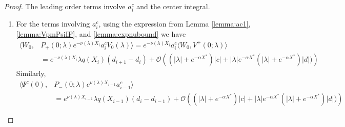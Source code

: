 \documentclass[thesis.tex]{subfiles}
\begin{document}
\begin{lemma}
\begin{proof}
The leading order terms involve $a_i^c$ and the center integral. 
\begin{enumerate}

\item For the terms involving $a_i^c$, using the expression from Lemma \ref{lemma:ac1}, \cref{lemma:VpmPsiIP}, and \cref{lemma:expnubound} we have
\begin{align*}
\langle W_0, &P_+(0; \lambda) e^{-\nu(\lambda)X_i} a_i^c V_0(\lambda) \rangle = e^{-\nu(\lambda)X_i} a_i^c \langle W_0, V^+(0; \lambda) \rangle \\
&= e^{-\nu(\lambda)X_i} \lambda q(X_i) (d_{i+1} - d_i ) + \mathcal{O}\left( (|\lambda| + e^{-\alpha X^*})|c| + |\lambda| e^{-\alpha X^*}(|\lambda| + e^{-\alpha X^*}) |d|) \right)
\end{align*}
Similarly, 
\begin{align*}
\langle \Psi^c(0), &P_-(0; \lambda) e^{\nu(\lambda) X_{i-1}} a_{i-1}^c \rangle \\
&= e^{\nu(\lambda)X_{i-1}} \lambda q(X_{i-1}) (d_i - d_{i-1} ) +\mathcal{O}\left( (|\lambda| + e^{-\alpha X^*})|c| + |\lambda| e^{-\alpha X^*}(|\lambda| + e^{-\alpha X^*}) |d|) \right)
\end{align*}


\end{enumerate}
\end{proof}
\end{lemma}
\end{document}
